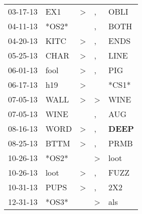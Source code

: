 \begin{supertabular}{p{0.07\textwidth}p{0.06\textwidth}p{0.02\textwidth}p{0.02\textwidth}p{0.06\textwidth}}
          03-17-13\textsuperscript{} &            EX1\textsuperscript{} &     \textgreater &                , &           OBLI\textsuperscript{} \\
          04-11-13\textsuperscript{} &                            *OS2* &                  &                , &           BOTH\textsuperscript{} \\
          04-20-13\textsuperscript{} &           KITC\textsuperscript{} &     \textgreater &                , &           ENDS\textsuperscript{} \\
          05-25-13\textsuperscript{} &           CHAR\textsuperscript{} &     \textgreater &                , &           LINE\textsuperscript{} \\
          06-01-13\textsuperscript{} &           fool\textsuperscript{} &     \textgreater &                , &            PIG\textsuperscript{} \\
          06-17-13\textsuperscript{} &            h19\textsuperscript{} &     \textgreater &                  &                            *CS1* \\
          07-05-13\textsuperscript{} &           WALL\textsuperscript{} &     \textgreater &     \textgreater &           WINE\textsuperscript{} \\
          07-05-13\textsuperscript{} &           WINE\textsuperscript{} &                  &                , &            AUG\textsuperscript{} \\
          08-16-13\textsuperscript{} &           WORD\textsuperscript{} &     \textgreater &                , &  \textbf{DEEP\textsuperscript{}} \\
          08-25-13\textsuperscript{} &           BTTM\textsuperscript{} &     \textgreater &                , &           PRMB\textsuperscript{} \\
          10-26-13\textsuperscript{} &                            *OS2* &                  &     \textgreater &           loot\textsuperscript{} \\
          10-26-13\textsuperscript{} &           loot\textsuperscript{} &     \textgreater &                , &           FUZZ\textsuperscript{} \\
          10-31-13\textsuperscript{} &           PUPS\textsuperscript{} &     \textgreater &                , &            2X2\textsuperscript{} \\
          12-31-13\textsuperscript{} &                            *OS3* &                  &     \textgreater &            als\textsuperscript{} \\

\end{supertabular}
